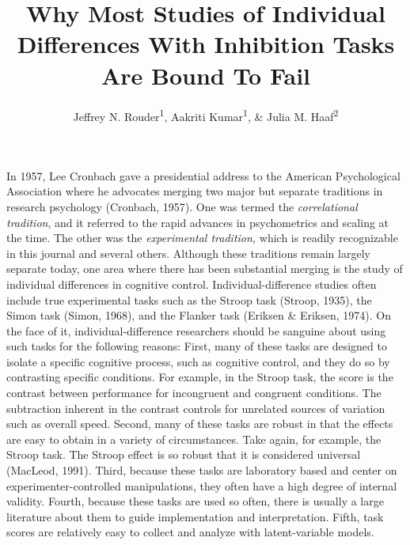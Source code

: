 \documentclass[
  english,
  ,man]{apa6}
\title{Why Most Studies of Individual Differences With Inhibition Tasks Are Bound To Fail}
\author{Jeffrey N. Rouder\textsuperscript{1}, Aakriti Kumar\textsuperscript{1}, \& Julia M. Haaf\textsuperscript{2}}
\date{}
\affiliation{\vspace{0.5cm}\textsuperscript{1} University of California, Irvine\\\textsuperscript{2} University of Amsterdam}
\begin{document}
\maketitle

In 1957, Lee Cronbach gave a presidential address to the American Psychological Association where he advocates merging two major but separate traditions in research psychology (Cronbach, 1957). One was termed the \emph{correlational tradition}, and it referred to the rapid advances in psychometrics and scaling at the time. The other was the \emph{experimental tradition,} which is readily recognizable in this journal and several others. Although these traditions remain largely separate today, one area where there has been substantial merging is the study of individual differences in cognitive control. Individual-difference studies often include true experimental tasks such as the Stroop task (Stroop, 1935), the Simon task (Simon, 1968), and the Flanker task (Eriksen \& Eriksen, 1974). On the face of it, individual-difference researchers should be sanguine about using such tasks for the following reasons: First, many of these tasks are designed to isolate a specific cognitive process, such as cognitive control, and they do so by contrasting specific conditions. For example, in the Stroop task, the score is the contrast between performance for incongruent and congruent conditions. The subtraction inherent in the contrast controls for unrelated sources of variation such as overall speed. Second, many of these tasks are robust in that the effects are easy to obtain in a variety of circumstances. Take again, for example, the Stroop task. The Stroop effect is so robust that it is considered universal (MacLeod, 1991). Third, because these tasks are laboratory based and center on experimenter-controlled manipulations, they often have a high degree of internal validity. Fourth, because these tasks are used so often, there is usually a large literature about them to guide implementation and interpretation. Fifth, task scores are relatively easy to collect and analyze with latent-variable models.
\end{document}

